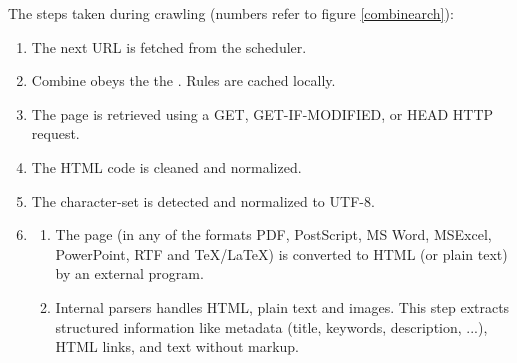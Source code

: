 The steps taken during crawling (numbers refer to figure \ref{combinearch}):
\begin{enumerate}
\item The next URL is fetched from the scheduler.

\item Combine obeys the the .
Rules are cached locally.

\item The page is retrieved using a GET, GET-IF-MODIFIED, or HEAD HTTP request.

\item The HTML code is cleaned and normalized.

\item The character-set is detected and normalized to UTF-8.

\item 

\begin{enumerate}
\item The page (in any of the formats PDF, PostScript, MS Word, MSExcel, PowerPoint, RTF and TeX/LaTeX) is converted to HTML (or plain 
text) by an external program.

\item Internal parsers handles HTML, plain text and images.
This step extracts structured information like metadata (title, keywords, description, ...), HTML links,
  and text without markup.
\end{enumerate}


\end{enumerate}

